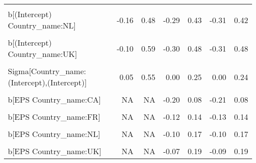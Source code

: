 \begin{table}
\begin{tabular}[t]{lrrrrrr}
\cellcolor{gray!10}{b[(Intercept) Country\_name:IL]} & \cellcolor{gray!10}{-0.84} & \cellcolor{gray!10}{0.65} & \cellcolor{gray!10}{-0.50} & \cellcolor{gray!10}{0.38} & \cellcolor{gray!10}{-0.46} & \cellcolor{gray!10}{0.40}\\
b[(Intercept) Country\_name:NL] & -0.16 & 0.48 & -0.29 & 0.43 & -0.31 & 0.42\\
\cellcolor{gray!10}{b[(Intercept) Country\_name:SE]} & \cellcolor{gray!10}{-0.94} & \cellcolor{gray!10}{-0.20} & \cellcolor{gray!10}{-0.65} & \cellcolor{gray!10}{0.28} & \cellcolor{gray!10}{-0.68} & \cellcolor{gray!10}{0.28}\\
b[(Intercept) Country\_name:UK] & -0.10 & 0.59 & -0.30 & 0.48 & -0.31 & 0.48\\
\cellcolor{gray!10}{b[(Intercept) Country\_name:US]} & \cellcolor{gray!10}{-0.40} & \cellcolor{gray!10}{0.30} & \cellcolor{gray!10}{-0.37} & \cellcolor{gray!10}{0.32} & \cellcolor{gray!10}{-0.36} & \cellcolor{gray!10}{0.33}\\
Sigma[Country\_name:(Intercept),(Intercept)] & 0.05 & 0.55 & 0.00 & 0.25 & 0.00 & 0.24\\
\cellcolor{gray!10}{b[EPS Country\_name:BE]} & \cellcolor{gray!10}{NA} & \cellcolor{gray!10}{NA} & \cellcolor{gray!10}{-0.04} & \cellcolor{gray!10}{0.30} & \cellcolor{gray!10}{-0.04} & \cellcolor{gray!10}{0.30}\\
b[EPS Country\_name:CA] & NA & NA & -0.20 & 0.08 & -0.21 & 0.08\\
\cellcolor{gray!10}{b[EPS Country\_name:CH]} & \cellcolor{gray!10}{NA} & \cellcolor{gray!10}{NA} & \cellcolor{gray!10}{-0.15} & \cellcolor{gray!10}{0.12} & \cellcolor{gray!10}{-0.15} & \cellcolor{gray!10}{0.12}\\
b[EPS Country\_name:FR] & NA & NA & -0.12 & 0.14 & -0.13 & 0.14\\
\cellcolor{gray!10}{b[EPS Country\_name:IL]} & \cellcolor{gray!10}{NA} & \cellcolor{gray!10}{NA} & \cellcolor{gray!10}{-0.24} & \cellcolor{gray!10}{0.23} & \cellcolor{gray!10}{-0.27} & \cellcolor{gray!10}{0.25}\\
b[EPS Country\_name:NL] & NA & NA & -0.10 & 0.17 & -0.10 & 0.17\\
\cellcolor{gray!10}{b[EPS Country\_name:SE]} & \cellcolor{gray!10}{NA} & \cellcolor{gray!10}{NA} & \cellcolor{gray!10}{-0.28} & \cellcolor{gray!10}{0.02} & \cellcolor{gray!10}{-0.29} & \cellcolor{gray!10}{0.03}\\
b[EPS Country\_name:UK] & NA & NA & -0.07 & 0.19 & -0.09 & 0.19\\

\end{tabular}
\end{table}
